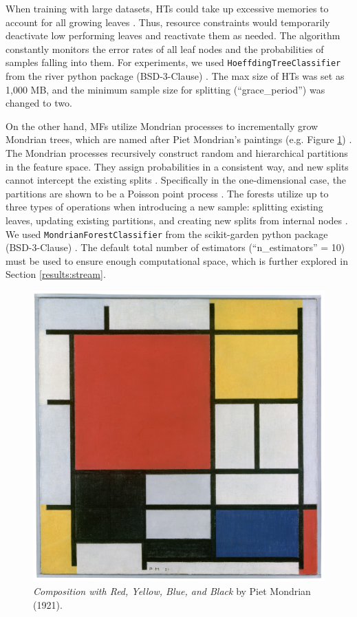 When training with large datasets, HTs could take up excessive memories to account for all growing leaves \citep{domingos_mining_2000, lavanya_handwritten_2017}. Thus, resource constraints would temporarily deactivate low performing leaves and reactivate them as needed. The algorithm constantly monitors the error rates of all leaf nodes and the probabilities of samples falling into them. 
For experiments, we used \texttt{HoeffdingTreeClassifier} from the river python package (BSD-3-Clause) \citep{montiel_river_2020}. The max size of HTs was set as 1,000 MB, and the minimum sample size for splitting (``grace\_period'') was changed to two.

On the other hand, MFs utilize Mondrian processes to incrementally grow Mondrian trees, which are named after Piet Mondrian's paintings (e.g. Figure \ref{fig:mondrian_paint}) \citep{lakshminarayanan_mondrian_2014, roy_mondrian_2009, mondrian_dutch_1921}. The Mondrian processes recursively construct random and hierarchical partitions in the feature space. They assign probabilities in a consistent way, and new splits cannot intercept the existing splits \citep{lakshminarayanan_mondrian_2014}. Specifically in the one-dimensional case, the partitions are shown to be a Poisson point process \citep{roy_mondrian_2009}. The forests utilize up to three types of operations when introducing a new sample: splitting existing leaves, updating existing partitions, and creating new splits from internal nodes \citep{lakshminarayanan_mondrian_2014}.
We used \texttt{MondrianForestClassifier} from the scikit-garden python package (BSD-3-Clause) \citep{kumar_scikit-gardenscikit-garden_2017}. The default total number of estimators (``n\_estimators'' = 10) must be used to ensure enough computational space, which is further explored in Section \ref{results:stream}.

\begin{figure}[!htb]
\centering
\includegraphics[width=0.3\columnwidth]{mondrian_paint.jpeg}
  \caption{\textit{Composition with Red, Yellow, Blue, and Black} by Piet Mondrian (1921).
  }
\label{fig:mondrian_paint}
\end{figure}

